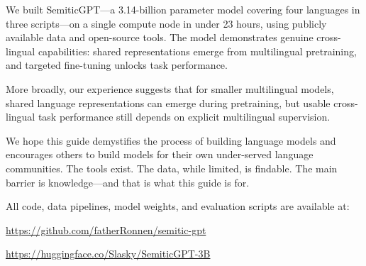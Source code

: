 \documentclass[11pt,a4paper]{article}
\begin{document}
\vspace{12pt}
\begin{tcolorbox}[colback=lightaccent, colframe=accent, title={\large\bfseries Final Words}]
We built SemiticGPT---a 3.14-billion parameter model covering four languages in three scripts---on a single compute node in under 23 hours, using publicly available data and open-source tools. The model demonstrates genuine cross-lingual capabilities: shared representations emerge from multilingual pretraining, and targeted fine-tuning unlocks task performance.

More broadly, our experience suggests that for smaller multilingual models, shared language representations can emerge during pretraining, but usable cross-lingual task performance still depends on explicit multilingual supervision.

We hope this guide demystifies the process of building language models and encourages others to build models for their own under-served language communities. The tools exist. The data, while limited, is findable. The main barrier is knowledge---and that is what this guide is for.

All code, data pipelines, model weights, and evaluation scripts are available at:

\begin{center}
\url{https://github.com/fatherRonnen/semitic-gpt}

\url{https://huggingface.co/Slasky/SemiticGPT-3B}
\end{center}
\end{tcolorbox}

\end{document}
